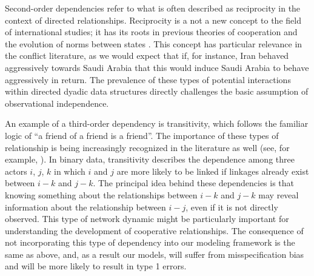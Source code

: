 \documentclass[3p,times,twocolumn,authoryear,12pt]{elsarticle}
\begin{document}
Second-order dependencies refer to what is often described as reciprocity in the context of directed relationships. Reciprocity is a not a new concept to the field of international studies; it has its roots in previous theories of cooperation and the evolution of norms between states \citep{richardson:1960,choucri:north:1972,ward:1981,cusack:ward:1981,ward:1984,goldstein:1991}. This concept has particular relevance in the conflict literature, as we would expect that if, for instance, Iran behaved aggressively towards Saudi Arabia that this would induce Saudi Arabia to behave aggressively in return. The prevalence of these types of potential interactions within directed dyadic data structures directly challenges the basic assumption of observational independence.

An example of a third-order dependency is transitivity, which follows the familiar logic of ``a friend of a friend is a friend''. The importance of these types of relationship is being increasingly recognized in the literature as well (see, for example, \citealp{lai:1995,manger:etal:2012,kinne:2013}). In binary data, transitivity describes the dependence among three actors $i$, $j$, $k$ in which $i$ and $j$ are more likely to be linked if linkages already exist between $i - k$ and $j - k$. The principal idea behind these dependencies is that knowing something about the relationships between $i-k$ and $j-k$ may reveal information about the relationship between $i-j$, even if it is not directly observed. This type of network dynamic might be particularly important for understanding the development of cooperative relationships. The consequence of not incorporating this type of dependency into our modeling framework is the same as above, and, as a result our models, will suffer from misspecification bias and will be more likely to result in type 1 errors. 
\end{document}
